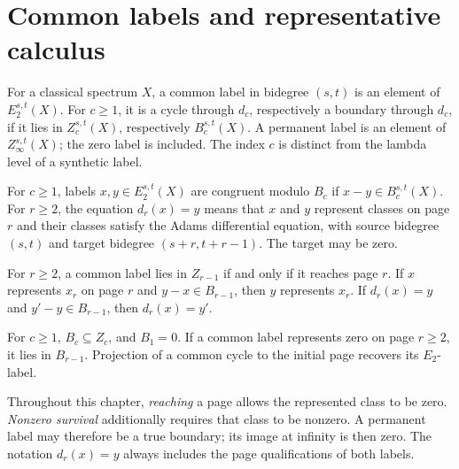 \section{Common labels and representative calculus}

\begin{definition}
\label{sem:ProofTools:common-labels}
For a classical spectrum $X$, a common label in bidegree $(s,t)$ is an element of $E_2^{s,t}(X)$. For $c\geq1$, it is a cycle through $d_c$, respectively a boundary through $d_c$, if it lies in $Z_c^{s,t}(X)$, respectively $B_c^{s,t}(X)$. A permanent label is an element of $Z_\infty^{s,t}(X)$; the zero label is included. The index $c$ is distinct from the lambda level of a synthetic label.

For $c\geq1$, labels $x,y\in E_2^{s,t}(X)$ are congruent modulo $B_c$ if $x-y\in B_c^{s,t}(X)$. For $r\geq2$, the equation $d_r(x)=y$ means that $x$ and $y$ represent classes on page $r$ and their classes satisfy the Adams differential equation, with source bidegree $(s,t)$ and target bidegree $(s+r,t+r-1)$. The target may be zero.
\end{definition}

For $r\geq2$, a common label lies in $Z_{r-1}$ if and only if it reaches page $r$. If $x$ represents $x_r$ on page $r$ and $y-x\in B_{r-1}$, then $y$ represents $x_r$. If $d_r(x)=y$ and $y'-y\in B_{r-1}$, then $d_r(x)=y'$.

For $c\geq1$, $B_c\subseteq Z_c$, and $B_1=0$. If a common label represents zero on page $r\geq2$, it lies in $B_{r-1}$. Projection of a common cycle to the initial page recovers its $E_2$-label.

Throughout this chapter, \emph{reaching} a page allows the represented
class to be zero. \emph{Nonzero survival} additionally requires that
class to be nonzero. A permanent label may therefore be a true boundary;
its image at infinity is then zero. The notation $d_r(x)=y$ always
includes the page qualifications of both labels.


